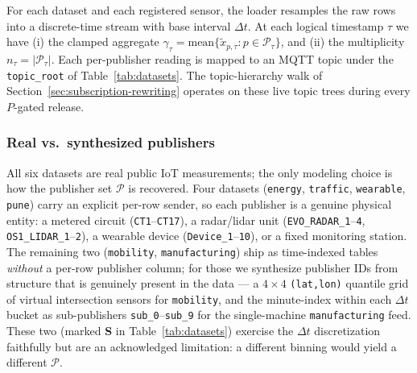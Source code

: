 For each dataset and each registered sensor, the loader resamples the raw rows into a discrete-time stream with base interval $\Delta t$. At each logical timestamp $\tau$ we have (i) the clamped aggregate $\gamma_\tau = \mathrm{mean}\{\tilde{x}_{p,\tau} : p \in \mathcal{P}_\tau\}$, and (ii) the multiplicity $n_\tau = |\mathcal{P}_\tau|$. Each per-publisher reading is mapped to an MQTT topic under the \texttt{topic\_root} of Table~\ref{tab:datasets}. The topic-hierarchy walk of Section~\ref{sec:subscription-rewriting} operates on these live topic trees during every $P$-gated release.

\subsubsection{Real vs.\ synthesized publishers}
\label{sec:pub-construction}
All six datasets are real public IoT measurements; the only modeling choice is how the publisher set $\mathcal{P}$ is recovered. Four datasets (\texttt{energy}, \texttt{traffic}, \texttt{wearable}, \texttt{pune}) carry an explicit per-row sender, so each publisher is a genuine physical entity: a metered circuit (\texttt{CT1}--\texttt{CT17}), a radar/lidar unit (\texttt{EVO\_RADAR\_1}--\texttt{4}, \texttt{OS1\_LIDAR\_1}--\texttt{2}), a wearable device (\texttt{Device\_1}--\texttt{10}), or a fixed monitoring station. The remaining two (\texttt{mobility}, \texttt{manufacturing}) ship as time-indexed tables \emph{without} a per-row publisher column; for those we synthesize publisher IDs from structure that is genuinely present in the data --- a $4\times4$ \texttt{(lat,lon)} quantile grid of virtual intersection sensors for \texttt{mobility}, and the minute-index within each $\Delta t$ bucket as sub-publishers \texttt{sub\_0}--\texttt{sub\_9} for the single-machine \texttt{manufacturing} feed. These two (marked \textbf{S} in Table~\ref{tab:datasets}) exercise the $\Delta t$ discretization faithfully but are an acknowledged limitation: a different binning would yield a different $\mathcal{P}$.

